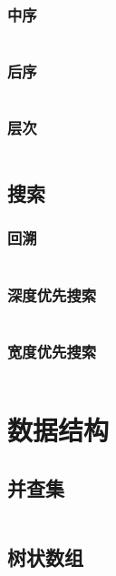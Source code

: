 \documentclass[a4paper,11pt]{article}
\begin{document}
\subsubsection{中序}
\inputminted[linenos,autogobble]{java}{basic/tree/in-order.java}

\subsubsection{后序}
\inputminted[linenos,autogobble]{java}{basic/tree/post-order.java}

\subsubsection{层次}
\inputminted[linenos,autogobble]{java}{basic/tree/level-order.java}

\newpage
\subsection{搜索}

\subsubsection{回溯}
\inputminted[linenos,autogobble]{java}{basic/search/backtracking.java}

\subsubsection{深度优先搜索}
\inputminted[linenos,autogobble]{java}{basic/search/dfs.java}

\subsubsection{宽度优先搜索}
\inputminted[linenos,autogobble]{java}{basic/search/bfs.java}


\newpage
\section{数据结构}

\subsection{并查集}
\inputminted[linenos,autogobble]{java}{data-structure/union-find.java}

\newpage
\subsection{树状数组}
\end{document}
